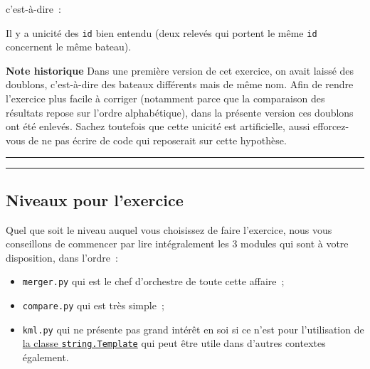 c'est-à-dire~:

\begin{Shaded}
\begin{Highlighting}[frame=lines,framerule=0.6mm,rulecolor=\color{asisframecolor}]
\NormalTok{[ }\NormalTok{, latitude, longitude, _, _, _, timestamp]}
\end{Highlighting}
\end{Shaded}

    Il y a unicité des \texttt{id} bien entendu (deux relevés qui portent le
même \texttt{id} concernent le même bateau).

\textbf{Note historique} Dans une première version de cet exercice, on
avait laissé des doublons, c'est-à-dire des bateaux différents mais de
même nom. Afin de rendre l'exercice plus facile à corriger (notamment
parce que la comparaison des résultats repose sur l'ordre alphabétique),
dans la présente version ces doublons ont été enlevés. Sachez toutefois
que cette unicité est artificielle, aussi efforcez-vous de ne pas écrire
de code qui reposerait sur cette hypothèse.

    \begin{center}\rule{0.5\linewidth}{\linethickness}\end{center}

    \begin{center}\rule{0.5\linewidth}{\linethickness}\end{center}

    \hypertarget{niveaux-pour-lexercice}{%
\subsection{Niveaux pour l'exercice}\label{niveaux-pour-lexercice}}

    Quel que soit le niveau auquel vous choisissez de faire l'exercice, nous
vous conseillons de commencer par lire intégralement les 3 modules qui
sont à votre disposition, dans l'ordre~:

\begin{itemize}
\tightlist
\item
  \texttt{merger.py} qui est le chef d'orchestre de toute cette
  affaire~;
\item
  \texttt{compare.py} qui est très simple~;
\item
  \texttt{kml.py} qui ne présente pas grand intérêt en soi si ce n'est
  pour l'utilisation de
  \href{https://docs.python.org/3/library/string.html\#template-strings}{la
  classe \texttt{string.Template}} qui peut être utile dans d'autres
  contextes également.
\end{itemize}

